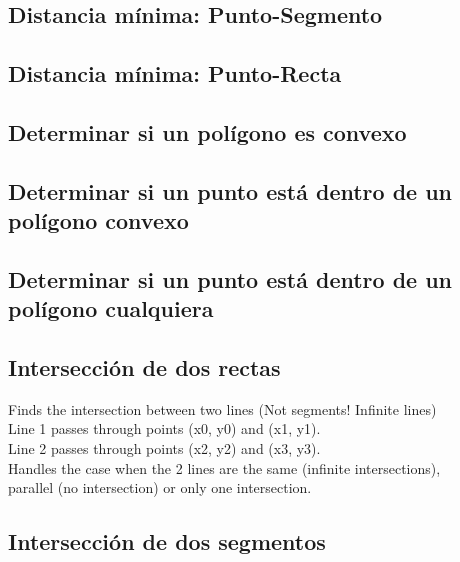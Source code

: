 \documentclass[10pt,letterpaper,twocolumn,twosided]{article}
\newcommand{\codigofuente}[1]{

\dotfill
}
\begin{document}
\subsection{Distancia mínima: Punto-Segmento}

\codigofuente{src/geom/minDistanceSgmntPnt.cpp}

\subsection{Distancia mínima: Punto-Recta}

\codigofuente{src/geom/punto_recta.cpp}

\subsection{Determinar si un polígono es convexo}

\codigofuente{src/geom/ifconvexpolygon.cpp}

\subsection{Determinar si un punto está dentro de un polígono convexo}

\codigofuente{src/geom/pointInaconvexpolygon.cpp}

\subsection{Determinar si un punto está dentro de un polígono cualquiera}

\codigofuente{src/geom/pointInAnyKindOfPolygon.cpp}

\subsection{Intersección de dos rectas}
Finds the intersection between two lines (Not segments! Infinite lines)\\
Line 1 passes through points (x0, y0) and (x1, y1).\\
Line 2 passes through points (x2, y2) and (x3, y3).\\
Handles the case when the 2 lines are the same (infinite intersections),\\
parallel (no intersection) or only one intersection.\\

\codigofuente{src/geom/intersectardosrectas.cpp}

\subsection{Intersección de dos segmentos}
\end{document}

